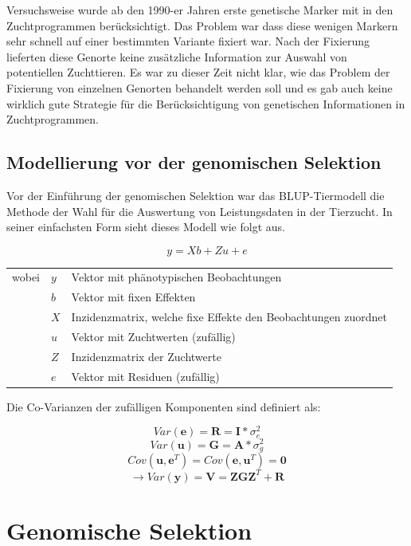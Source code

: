 \documentclass[]{book}
\begin{document}
Versuchsweise wurde ab den 1990-er Jahren erste genetische Marker mit in
den Zuchtprogrammen berücksichtigt. Das Problem war dass diese wenigen
Markern sehr schnell auf einer bestimmten Variante fixiert war. Nach der
Fixierung lieferten diese Genorte keine zusätzliche Information zur
Auswahl von potentiellen Zuchttieren. Es war zu dieser Zeit nicht klar,
wie das Problem der Fixierung von einzelnen Genorten behandelt werden
soll und es gab auch keine wirklich gute Strategie für die
Berücksichtigung von genetischen Informationen in Zuchtprogrammen.

\subsection{Modellierung vor der genomischen
Selektion}\label{modellierung-vor-der-genomischen-selektion}

Vor der Einführung der genomischen Selektion war das BLUP-Tiermodell die
Methode der Wahl für die Auswertung von Leistungsdaten in der Tierzucht.
In seiner einfachsten Form sieht dieses Modell wie folgt aus.

\begin{equation}
  y = Xb + Zu + e
\end{equation}

\begin{tabular}{lll} 
wobei  &  $y$  &  Vektor mit phänotypischen Beobachtungen\\ 
       &  $b$  & Vektor mit fixen Effekten              \\ 
       &  $X$  & Inzidenzmatrix, welche fixe Effekte den Beobachtungen zuordnet\\ 
       &  $u$  & Vektor mit Zuchtwerten (zufällig) \\ 
       &  $Z$  & Inzidenzmatrix der Zuchtwerte \\ 
       &  $e$  & Vektor mit Residuen (zufällig) 
\end{tabular}

Die Co-Varianzen der zufälligen Komponenten sind definiert als:

\[Var(\mathbf{e}) = \mathbf{R} = \mathbf{I}*\sigma_e^2\]
\[Var(\mathbf{u}) = \mathbf{G} = \mathbf{A} * \sigma_g^2\]
\[Cov(\mathbf{u},\mathbf{e}^T) = Cov(\mathbf{e}, \mathbf{u}^T) = \mathbf{0}\]
\[\rightarrow Var(\mathbf{y}) = \mathbf{V} = \mathbf{ZGZ}^T + \mathbf{R}\]

\section{Genomische Selektion}\label{gensel}
\end{document}
